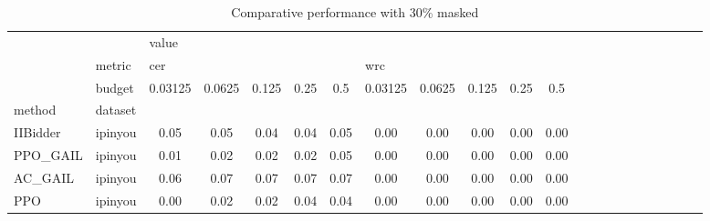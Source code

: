 \begin{table}[htbp]
\centering
\caption{Comparative performance with 30\% masked}
\label{mask_0.30}
\begin{tabular}{l|l|cc|cc|cc|cc|cc|cc|cc|cc|cc|cc}
\toprule
    & {} & \multicolumn{10}{l}{value} \\
    & metric & \multicolumn{5}{l}{cer} & \multicolumn{5}{l}{wrc} \\
    & budget & 0.03125 & 0.0625 & 0.125 & 0.25 &  0.5 & 0.03125 & 0.0625 & 0.125 & 0.25 &  0.5 \\
method & dataset &         &        &       &      &      &         &        &       &      &      \\
\midrule
IIBidder & ipinyou &    0.05 &   0.05 &  0.04 & 0.04 & 0.05 &    0.00 &   0.00 &  0.00 & 0.00 & 0.00 \\
PPO\_GAIL & ipinyou &    0.01 &   0.02 &  0.02 & 0.02 & 0.05 &    0.00 &   0.00 &  0.00 & 0.00 & 0.00 \\
AC\_GAIL & ipinyou &    0.06 &   0.07 &  0.07 & 0.07 & 0.07 &    0.00 &   0.00 &  0.00 & 0.00 & 0.00 \\
PPO & ipinyou &    0.00 &   0.02 &  0.02 & 0.04 & 0.04 &    0.00 &   0.00 &  0.00 & 0.00 & 0.00 \\
\bottomrule
\end{tabular}
\end{table}
